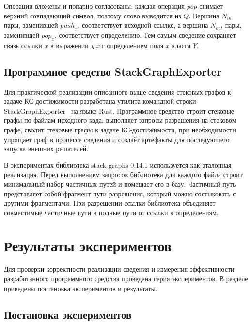 Операции вложены и попарно согласованы: каждая операция \(pop\) снимает верхний совпадающий символ, поэтому слово выводится из \(Q\). Вершина \(N_{in}\) пары, заменившей \({push}_{x}\), соответствует исходной ссылке, а вершина \(N_{out}\) пары, заменившей \({pop}_{x}\), соответствует определению. Тем самым сведение сохраняет связь ссылки \(x\) в выражении \emph{y.x} с определением поля \(x\) класса \(Y\).

\subsection{Программное средство StackGraphExporter}\label{sec:exporter}

Для практической реализации описанного выше сведения стековых графов к задаче КС-достижимости разработана утилита командной строки StackGraphExporter~\cite{CoreJustStackGraphExporter} на языке Rust. Программное средство строит стековые графы по файлам исходного кода, выполняет запросы разрешения на стековом графе, сводит стековые графы к задаче КС-достижимости, при необходимости упрощает граф в процессе сведения и создаёт артефакты для последующего запуска внешних решателей.

В экспериментах библиотека stack-graphs 0.14.1 используется как эталонная реализация. Перед выполнением запросов библиотека для каждого файла строит минимальный набор частичных путей и помещает его в базу. Частичный путь представляет собой фрагмент пути разрешения, который можно состыковать с другими фрагментами. При разрешении ссылки библиотека объединяет совместимые частичные пути в полные пути от ссылки к определениям.

\section{Результаты экспериментов}\label{sec:experiments}

Для проверки корректности реализации сведения и измерения эффективности разработанного программного средства проведена серия экспериментов. В разделе приведены постановка экспериментов и результаты.

\subsection{Постановка экспериментов}\label{sec:experiment-setup}

